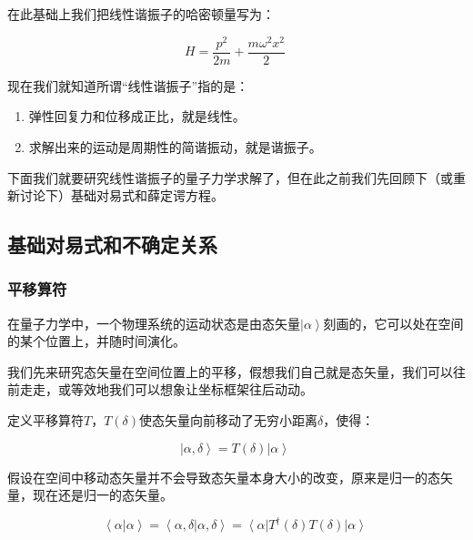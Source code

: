 在此基础上我们把线性谐振子的哈密顿量写为：

\begin{equation}
H = \frac{p^2}{2m} + \frac{m \omega^2 x^2}{2}~
\end{equation}

现在我们就知道所谓“线性谐振子”指的是：

\begin{enumerate}

\item 

弹性回复力和位移成正比，就是线性。

\item

求解出来的运动是周期性的简谐振动，就是谐振子。

\end{enumerate}

下面我们就要研究线性谐振子的量子力学求解了，但在此之前我们先回顾下（或重新讨论下）基础对易式和薛定谔方程。

\subsection{基础对易式和不确定关系}

\subsubsection{平移算符}

在量子力学中，一个物理系统的运动状态是由态矢量$\left| \alpha \right\rangle$刻画的，它可以处在空间的某个位置上，并随时间演化。

我们先来研究态矢量在空间位置上的平移，假想我们自己就是态矢量，我们可以往前走走，或等效地我们可以想象让坐标框架往后动动。

定义平移算符$T$，$T(\delta)$使态矢量向前移动了无穷小距离$\delta$，使得：

\begin{equation}
\left| \alpha, \delta \right\rangle = T(\delta) \left| \alpha \right\rangle ~
\end{equation}

假设在空间中移动态矢量并不会导致态矢量本身大小的改变，原来是归一的态矢量，现在还是归一的态矢量。

\begin{equation}
\left\langle \alpha | \alpha \right\rangle = \left\langle \alpha, \delta | \alpha, \delta \right\rangle = \left\langle \alpha \right| T^\dagger(\delta) T(\delta) \left| \alpha \right\rangle~
\end{equation}

